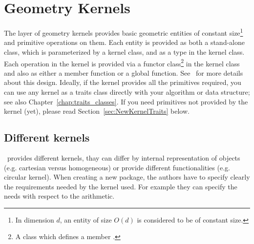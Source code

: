 
\chapter{Geometry Kernels\label{chap:kernels}}


The layer of geometry kernels provides
basic geometric entities of constant size\footnote{In dimension $d$,
an entity of size $O(d)$ is considered to be of constant size.} and
primitive operations on them. Each entity is provided as both a
stand-alone class, which is parameterized by a kernel class, and as a
type in the kernel class. Each operation in the kernel is provided via
a functor class\footnote{A class which defines a member
.} in the  kernel
class and also as either a member function or a global function.
See~\cite{hhkps-aegk-01} for more details about this design.
% 
% 
Ideally, if the kernel provides all the primitives required, you can
use any kernel as a traits class directly with your algorithm or data
structure; see also Chapter~\ref{chap:traits_classes}. If you need
primitives not provided by the kernel (yet), please read
Section~\ref{sec:NewKernelTraits} below.

\section{Different kernels\label{sec:different_kernels}}

\cgal\ provides different kernels, thay can differ by internal
representation of objects (e.g.  cartesian versus  homogeneous) 
or provide different functionalities (e.g. circular kernel).
When creating a new package, the authors have to specify clearly
the requirements needed by the kernel used.
For example they can specify the needs with respect to the arithmetic.

